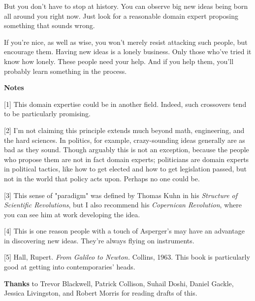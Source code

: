 But you don't have to
                  stop at history. You can observe big new ideas being born all
                  around you right now. Just look for a reasonable domain expert
                  proposing something that sounds wrong.

If you're
                  nice, as well as wise, you won't merely resist attacking such
                  people, but encourage them. Having new ideas is a lonely
                  business. Only those who've tried it know how lonely. These
                  people need your help. And if you help them, you'll probably
                  learn something in the process.









\textbf{Notes}

[1] This domain expertise could be in another field. Indeed,
                  such crossovers tend to be particularly promising.

[2] I'm not claiming this principle extends much beyond math,
                  engineering, and the hard sciences. In politics, for example,
                  crazy-sounding ideas generally are as bad as they sound.
                  Though arguably this is not an exception, because the people
                  who propose them are not in fact domain experts; politicians
                  are domain experts in political tactics, like how to get
                  elected and how to get legislation passed, but not in the
                  world that policy acts upon. Perhaps no one could be.

[3] This sense of "paradigm" was defined by Thomas Kuhn in his
                  \emph{Structure of Scientific Revolutions}, but I also
                  recommend his \emph{Copernican Revolution}, where you can see
                  him at work developing the idea.

[4] This is one reason people with a touch of Asperger's may
                  have an advantage in discovering new ideas. They're always
                  flying on instruments.

[5] Hall, Rupert. \emph{From Galileo to Newton.} Collins, 1963.
                  This book is particularly good at getting into contemporaries'
                  heads.



\textbf{Thanks} to Trevor
                  Blackwell, Patrick Collison, Suhail Doshi, Daniel Gackle,
                  Jessica Livingston, and Robert Morris for reading drafts of
                  this.


              
            
          
            
              
                


                  
              
            
          
